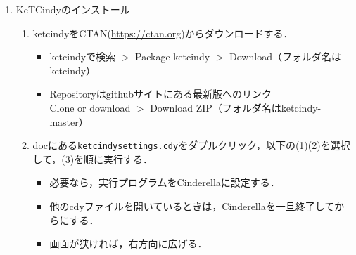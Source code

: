 \documentclass{ujarticle}
\begin{document}
\begin{enumerate}[\bf\large 1.]
\begin{enumerate}[(1)]
\end{enumerate}
 
\item KeTCindyのインストール\vspace{-2mm}
  \begin{enumerate}[(1)]
  \item ketcindyをCTAN(\url{https://ctan.org})からダウンロードする．
    \begin{itemize}
     \item ketcindyで検索 $>$ Package ketcindy $>$ Download（フォルダ名はketcindy）
     \item Repositoryはgithubサイトにある最新版へのリンク\\
        \hspace*{10mm}Clone or download $>$ Download ZIP（フォルダ名はketcindy-master）
     \end{itemize}
  \item docにある\verb|ketcindysettings.cdy|をダブルクリック，以下の(1)(2)を選択して，(3)を順に実行する．
    \begin{itemize}
    \item 必要なら，実行プログラムをCinderellaに設定する．
    \item 他のcdyファイルを開いているときは，Cinderellaを一旦終了してからにする．
   \item 画面が狭ければ，右方向に広げる．
   \end{itemize}
  \end{enumerate}



\end{enumerate}
\end{document}
